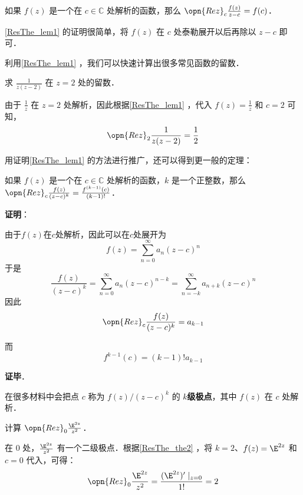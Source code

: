 \begin{lemma}{}\label{ResThe_lem1}
如果 $f(z)$ 是一个在 $c\in\mathbb{C}$ 处解析的函数，那么 $\opn{Rez}_c\frac{f(z)}{z-c}=f(c)$．
\end{lemma}

\autoref{ResThe_lem1} 的证明很简单，将 $f(z)$ 在 $c$ 处泰勒展开以后再除以 $z-c$ 即可．

利用\autoref{ResThe_lem1} ，我们可以快速计算出很多常见函数的留数．

\begin{example}{}
求 $\frac{1}{z(z-2)}$ 在 $z=2$ 处的留数．

由于 $\frac{1}{z}$ 在 $z=2$ 处解析，因此根据\autoref{ResThe_lem1} ，代入 $f(z)=\frac{1}{z}$ 和 $c=2$ 可知，
\begin{equation}
\opn{Rez}_2\frac{1}{z(z-2)}=\frac{1}{2}
\end{equation}
\end{example}

用证明\autoref{ResThe_lem1} 的方法进行推广，还可以得到更一般的定理：

\begin{theorem}{}\label{ResThe_the2}
如果 $f(z)$ 是一个在 $c\in\mathbb{C}$ 处解析的函数，$k$ 是一个正整数，那么 $\opn{Rez}_c\frac{f(z)}{(z-c)^k}=\frac{f^{(k-1)}(c)}{(k-1)!}$．
\end{theorem}

\textbf{证明}：

由于$f(z)$在$c$处解析，因此可以在$c$处展开为
\begin{equation}
f(z) = \sum_{n=0}^\infty a_n(z-c)^n
\end{equation}
于是
\begin{equation}
\frac{f(z)}{(z-c)^k} = \sum_{n=0}^\infty a_n(z-c)^{n-k} = \sum_{n=-k}^\infty a_{n+k}(z-c)^n
\end{equation}
因此
\begin{equation}
\opn{Rez}_c\frac{f(z)}{(z-c)^k} = a_{k-1}
\end{equation}

而
\begin{equation}
f^{k-1}(c)=(k-1)!a_{k-1}
\end{equation}

\textbf{证毕}．




在很多材料中会把点 $c$ 称为 $f(z)/(z-c)^k$ 的 $k$\textbf{级极点}，其中 $f(z)$ 在 $c$ 处解析．

\begin{example}{}
计算 $\opn{Rez}_0 \frac{\E^{2z}}{z^2}$．

在 $0$ 处，$\frac{\E^{2z}}{z^2}$ 有一个二级极点．根据\autoref{ResThe_the2} ，将 $k=2$、$f(z)=\E^{2z}$ 和 $c=0$ 代入，可得：
\begin{equation}
\opn{Rez}_0\frac{\E^{2z}}{z^2}=\frac{(\E^{2z})'\mid_{z=0}}{1!}=2
\end{equation}


\end{example}












